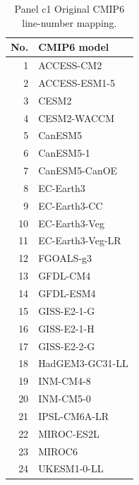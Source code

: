 \begin{table}[tp]
\centering
\footnotesize
\begin{tabular}{rl}
\toprule
No. & CMIP6 model \\
\midrule
1 & ACCESS-CM2 \\
2 & ACCESS-ESM1-5 \\
3 & CESM2 \\
4 & CESM2-WACCM \\
5 & CanESM5 \\
6 & CanESM5-1 \\
7 & CanESM5-CanOE \\
8 & EC-Earth3 \\
9 & EC-Earth3-CC \\
10 & EC-Earth3-Veg \\
11 & EC-Earth3-Veg-LR \\
12 & FGOALS-g3 \\
13 & GFDL-CM4 \\
14 & GFDL-ESM4 \\
15 & GISS-E2-1-G \\
16 & GISS-E2-1-H \\
17 & GISS-E2-2-G \\
18 & HadGEM3-GC31-LL \\
19 & INM-CM4-8 \\
20 & INM-CM5-0 \\
21 & IPSL-CM6A-LR \\
22 & MIROC-ES2L \\
23 & MIROC6 \\
24 & UKESM1-0-LL \\
\bottomrule
\end{tabular}
\caption{Panel c1 Original CMIP6 line-number mapping.}
\label{tab:figure2_panel_c1_original_cmip6_model_numbers}
\end{table}
